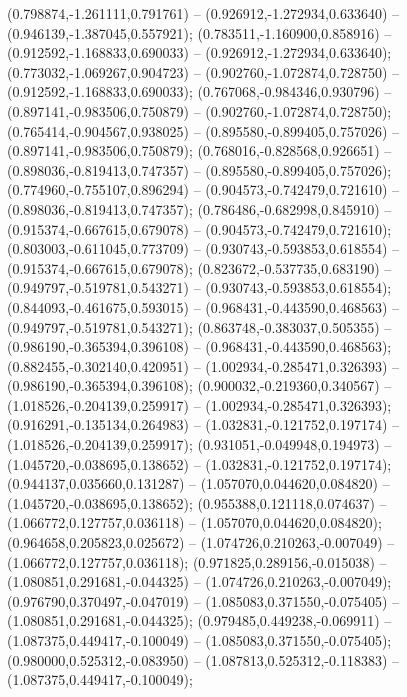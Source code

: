  (0.798874,-1.261111,0.791761) -- (0.926912,-1.272934,0.633640) -- (0.946139,-1.387045,0.557921);
 (0.783511,-1.160900,0.858916) -- (0.912592,-1.168833,0.690033) -- (0.926912,-1.272934,0.633640);
 (0.773032,-1.069267,0.904723) -- (0.902760,-1.072874,0.728750) -- (0.912592,-1.168833,0.690033);
 (0.767068,-0.984346,0.930796) -- (0.897141,-0.983506,0.750879) -- (0.902760,-1.072874,0.728750);
 (0.765414,-0.904567,0.938025) -- (0.895580,-0.899405,0.757026) -- (0.897141,-0.983506,0.750879);
 (0.768016,-0.828568,0.926651) -- (0.898036,-0.819413,0.747357) -- (0.895580,-0.899405,0.757026);
 (0.774960,-0.755107,0.896294) -- (0.904573,-0.742479,0.721610) -- (0.898036,-0.819413,0.747357);
 (0.786486,-0.682998,0.845910) -- (0.915374,-0.667615,0.679078) -- (0.904573,-0.742479,0.721610);
 (0.803003,-0.611045,0.773709) -- (0.930743,-0.593853,0.618554) -- (0.915374,-0.667615,0.679078);
 (0.823672,-0.537735,0.683190) -- (0.949797,-0.519781,0.543271) -- (0.930743,-0.593853,0.618554);
 (0.844093,-0.461675,0.593015) -- (0.968431,-0.443590,0.468563) -- (0.949797,-0.519781,0.543271);
 (0.863748,-0.383037,0.505355) -- (0.986190,-0.365394,0.396108) -- (0.968431,-0.443590,0.468563);
 (0.882455,-0.302140,0.420951) -- (1.002934,-0.285471,0.326393) -- (0.986190,-0.365394,0.396108);
 (0.900032,-0.219360,0.340567) -- (1.018526,-0.204139,0.259917) -- (1.002934,-0.285471,0.326393);
 (0.916291,-0.135134,0.264983) -- (1.032831,-0.121752,0.197174) -- (1.018526,-0.204139,0.259917);
 (0.931051,-0.049948,0.194973) -- (1.045720,-0.038695,0.138652) -- (1.032831,-0.121752,0.197174);
 (0.944137,0.035660,0.131287) -- (1.057070,0.044620,0.084820) -- (1.045720,-0.038695,0.138652);
 (0.955388,0.121118,0.074637) -- (1.066772,0.127757,0.036118) -- (1.057070,0.044620,0.084820);
 (0.964658,0.205823,0.025672) -- (1.074726,0.210263,-0.007049) -- (1.066772,0.127757,0.036118);
 (0.971825,0.289156,-0.015038) -- (1.080851,0.291681,-0.044325) -- (1.074726,0.210263,-0.007049);
 (0.976790,0.370497,-0.047019) -- (1.085083,0.371550,-0.075405) -- (1.080851,0.291681,-0.044325);
 (0.979485,0.449238,-0.069911) -- (1.087375,0.449417,-0.100049) -- (1.085083,0.371550,-0.075405);
 (0.980000,0.525312,-0.083950) -- (1.087813,0.525312,-0.118383) -- (1.087375,0.449417,-0.100049);
